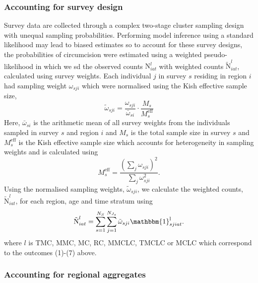 \documentclass{article}
\begin{document}
\begin{appendix}
\subsubsection{Accounting for survey design}


\noindent Survey data are collected through a complex two-stage cluster sampling design with unequal sampling probabilities. Performing model inference using a standard likelihood may lead to biased estimates so to account for these survey designs, the probabilities of circumcision were estimated using a weighted pseudo-likelihood in which we sd the observed counts $\text{N}^l_{iat}$ with weighted counts $\tilde{\text{N}}^l_{iat}$, calculated using survey weights. Each individual $j$ in survey $s$ residing in region $i$ had sampling weight $\omega_{sji}$ which were normalised using the Kish effective sample size, 
\begin{equation*}
	\tilde\omega_{sji} = \frac{\omega_{sji}}{\bar{\omega}_{si}}\cdot \frac{M_s}{M^{\text{eff}}_s} 
\end{equation*}
Here, $\bar{\omega}_{si}$ is the arithmetic mean of all survey weights from the individuals sampled in survey $s$ and region $i$ and $M_s$ is the total sample size in survey $s$ and $M^{\text{eff}}_s$ is the Kish effective sample size which accounts for heterogeneity in sampling weights and is calculated using 
\begin{equation*}
	M^{\text{eff}}_s = \frac{(\sum_j \omega_{sji})^2}{\sum_j \omega_{sji}^{2}}.
\end{equation*}
Using the normalised sampling weights, $\tilde\omega_{sji}$, we calculate the weighted counts, $\tilde{\text{N}}^l_{iat}$, for each region, age and time stratum using 
\begin{equation*}
	\tilde{\text{N}}^{l}_{iat} = \sum_{s=1}^{N_S}\sum_{j=1}^{N_{J_s}}\tilde\omega_{sji} \mathbbm{1}^{\text{l}}_{sjiat}.
\end{equation*}
where $l$ is TMC, MMC, MC, RC, MMCLC, TMCLC or MCLC which correspond to the outcomes (1)-(7) above. 


\subsubsection{Accounting for regional aggregates}



\end{appendix}
\end{document}
